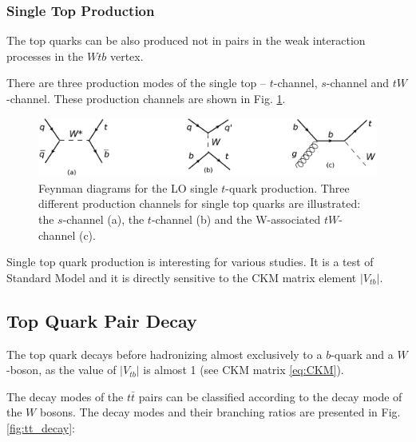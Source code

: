 \subsubsection{Single Top Production}

The top quarks can be also produced not in pairs in the weak interaction processes in the $Wtb$ vertex.

There are three production modes of the single top -- $t$-channel, $s$-channel and $tW$-channel. These production channels are shown in Fig. \ref{fig:single_t_prod}.

\begin{figure}[h]
  \centering
  \includegraphics[width=1.0\textwidth]{01_Theory_SM/plots/single_top_uniform.png}
  \caption{Feynman diagrams for the LO single $t$-quark production. Three different production channels for single top quarks are illustrated: 
  the $s$-channel (a), the $t$-channel (b) and the W-associated $tW$-channel (c).}
  \label{fig:single_t_prod}
\end{figure}

Single top quark production is interesting for various studies. It is a test of Standard Model and it is directly sensitive to the CKM matrix
element $|V_{tb}|$.

\subsection{Top Quark Pair Decay}\label{ssec:tdecay}

The top quark decays before hadronizing almost exclusively to a $b$-quark and a $W$-boson, as the value of $|V_{tb}|$ is almost 1 (see CKM matrix \ref{eq:CKM}).

The decay modes of the $t\bar{t}$ pairs can be classified according to the decay mode of the $W$ bosons. The decay modes and their branching ratios are presented
in Fig. \ref{fig:tt_decay}:

